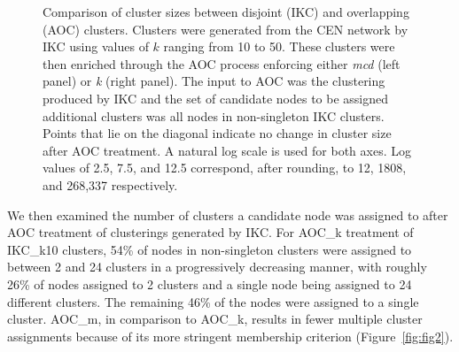 \documentclass[12pt, oneside]{article}   	%
\begin{document}
\begin{figure}[H]
\begin{subfigure}[t]{0.48\textwidth}
\end{subfigure}
\captionsetup{width=0.9\textwidth}	
\caption{Comparison of cluster sizes between disjoint (IKC)  and overlapping (AOC) clusters. Clusters were generated from the CEN network by IKC using values of $k$ ranging from 10 to 50. These clusters were then enriched through the AOC process enforcing either \emph{mcd} (left panel) or \emph{k} (right panel). The input to AOC was the  clustering produced by 
IKC and the set of candidate nodes to be assigned additional clusters was all nodes in non-singleton IKC clusters.  Points that lie on the diagonal indicate no change in cluster size after AOC treatment. A natural log scale is used for both axes. Log values of 2.5, 7.5, and 12.5 correspond, after rounding, to 12, 1808, and 268,337 respectively.}
\label{fig:fig1}
\end{figure}
	
We then examined the number of clusters a candidate node was assigned to after AOC treatment of clusterings generated by  IKC. For AOC\_k treatment of IKC\_k10 clusters, 54\% of nodes in non-singleton clusters were assigned to between 2 and 24 clusters in a progressively decreasing manner, with roughly 26\% of nodes assigned to 2 clusters and a single node being assigned to 24 different clusters.  The remaining 46\% of the nodes were assigned to a single cluster. AOC\_m, in comparison to AOC\_k, results in fewer multiple cluster assignments because of its more stringent membership criterion (Figure~\ref{fig:fig2}).
	
\end{document}
